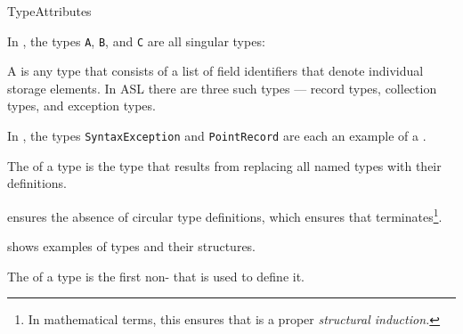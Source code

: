 \begin{TypingRuleList}{TypeAttributes}

%

In , the types \texttt{A}, \texttt{B}, and \texttt{C} are all singular types:



\hypertarget{def-structuredtype}{}
A \emph{\structuredtypeterm} is any type that consists of a list of field
identifiers that denote individual storage elements.
In ASL there are three such types --- record types, collection types, and
exception types.


In , the types \texttt{SyntaxException} and \texttt{PointRecord}
are each an example of a \structuredtypeterm{}.


The \hypertarget{def-tstruct}{\emph{\structureterm}} of a type is the type that results from replacing all named types
with their definitions.

 ensures the absence of circular type definitions,
which ensures that  terminates\footnote{In mathematical terms,
this ensures that  is a proper \emph{structural induction.}}.

 shows examples of types and their structures.




The \emph{\underlyingtypeterm{}} of a type is the
first non-\namedtype{} that is used to define it.


\end{TypingRuleList}
